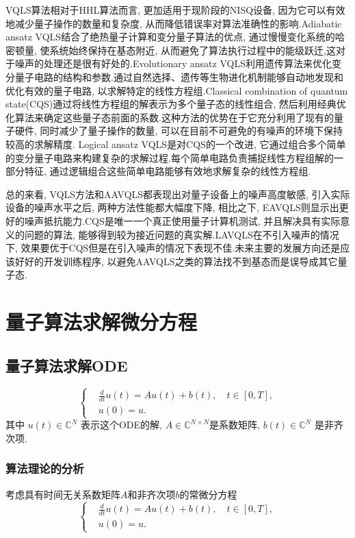 VQLS算法相对于HHL算法而言, 更加适用于现阶段的NISQ设备, 因为它可以有效地减少量子操作的数量和复杂度, 从而降低错误率对算法准确性的影响.Adiabatic ansatz VQLS\cite{26}结合了绝热量子计算和变分量子算法的优点, 通过慢慢变化系统的哈密顿量, 使系统始终保持在基态附近, 从而避免了算法执行过程中的能级跃迁,这对于噪声的处理还是很有好处的.Evolutionary ansatz VQLS\cite{27}利用遗传算法来优化变分量子电路的结构和参数.通过自然选择、遗传等生物进化机制能够自动地发现和优化有效的量子电路, 以求解特定的线性方程组.Classical combination of quantum state(CQS)\cite{28}通过将线性方程组的解表示为多个量子态的线性组合, 然后利用经典优化算法来确定这些量子态前面的系数.这种方法的优势在于它充分利用了现有的量子硬件, 同时减少了量子操作的数量, 可以在目前不可避免的有噪声的环境下保持较高的求解精度. Logical ansatz VQLS\cite{29}是对CQS的一个改进, 它通过组合多个简单的变分量子电路来构建复杂的求解过程.每个简单电路负责捕捉线性方程组解的一部分特征, 通过逻辑组合这些简单电路能够有效地求解复杂的线性方程组.
\par
总的来看\cite{30}, VQLS方法和AAVQLS都表现出对量子设备上的噪声高度敏感, 引入实际设备的噪声水平之后, 两种方法性能都大幅度下降, 相比之下, EAVQLS则显示出更好的噪声抵抗能力.CQS是唯一一个真正使用量子计算机测试, 并且解决具有实际意义的问题的算法, 能够得到较为接近问题的真实解.LAVQLS在不引入噪声的情况下, 效果要优于CQS但是在引入噪声的情况下表现不佳.未来主要的发展方向还是应该好好的开发训练程序, 以避免AAVQLS之类的算法找不到基态而是误导成其它量子态.
\chapter{量子算法求解微分方程}
\section{量子算法求解ODE}
\begin{equation}\label{eqn:ODE_general}
	\left\{\begin{aligned}
		&\frac{d}{dt} u(t)= Au(t) + b(t), \quad t \in [0,T], \\
		&u(0) = u.
	\end{aligned}\right.
\end{equation}
其中 $u(t) \in \mathbb{C}^N$ 表示这个ODE的解, $A \in \mathbb{C}^{N\times N}$是系数矩阵,  $b(t) \in \mathbb{C}^N$ 是非齐次项. 
\subsection{算法理论的分析 }
考虑具有时间无关系数矩阵$A$和非齐次项$b$的常微分方程
\begin{equation}\label{eqn:ODE}
	\left\{\begin{aligned}
		&\frac{d}{dt} u(t)= Au(t) + b(t), \quad t \in [0,T], \\
		&u(0) = u.
	\end{aligned}\right.
\end{equation}

